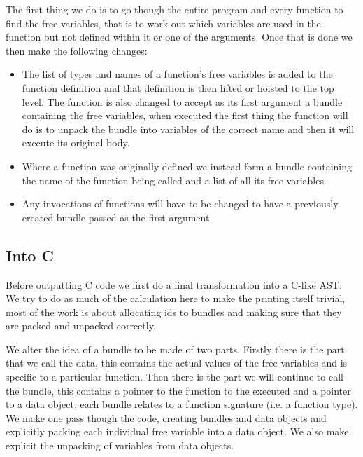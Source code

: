 \documentclass[a4paper]{article}
\begin{document}
The first thing we do is to go though the entire program and every function to find the free variables, that is to work out which variables are used in the function but not defined within it or one of the arguments. Once that is done we then make the following changes:
\begin{itemize}
\item
	The list of types and names of a function's free variables is added to the function definition and that definition is then lifted or hoisted to the top level. The function is also changed to accept as its first argument a bundle containing the free variables, when executed the first thing the function will do is to unpack the bundle into variables of the correct name and then it will execute its original body.

\item
	Where a function was originally defined we instead form a bundle containing the name of the function being called and a list of all its free variables.

\item
	Any invocations of functions will have to be changed to have a previously created bundle passed as the first argument.

\end{itemize}




\subsection{Into C}

Before outputting C code we first do a final transformation into a C-like AST. We try to do as much of the calculation here to make the printing itself trivial, most of the work is about allocating ids to bundles and making sure that they are packed and unpacked correctly.

We alter the idea of a bundle to be made of two parts. Firstly there is the part that we call the data, this contains the actual values of the free variables and is specific to a particular function. Then there is the part we will continue to call the bundle, this contains a pointer to the function to the executed and a pointer to a data object, each bundle relates to a function signature (i.e. a function type). We make one pass though the code, creating bundles and data objects and explicitly packing each individual free variable into a data object. We also make explicit the unpacking of variables from data objects.
\end{document}
